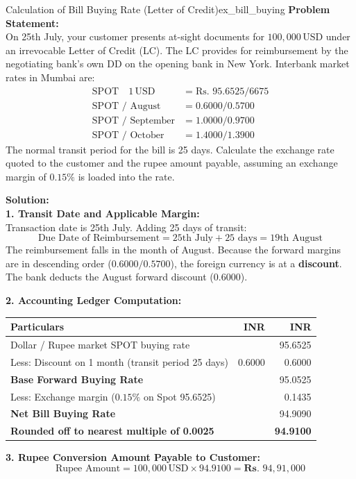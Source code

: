 \begin{example}{Calculation of Bill Buying Rate (Letter of Credit)}{ex_bill_buying}
\textbf{Problem Statement:}\\
On 25th July, your customer presents at-sight documents for $100,000\,\text{USD}$ under an irrevocable Letter of Credit (LC). The LC provides for reimbursement by the negotiating bank's own DD on the opening bank in New York. Interbank market rates in Mumbai are:
\begin{align*}
    \text{SPOT} \quad 1\,\text{USD} &= \text{Rs. } 95.6525 / 6675 \\
    \text{SPOT / August} &= 0.6000 / 0.5700 \\
    \text{SPOT / September} &= 1.0000 / 0.9700 \\
    \text{SPOT / October} &= 1.4000 / 1.3900
\end{align*}
The normal transit period for the bill is 25 days. Calculate the exchange rate quoted to the customer and the rupee amount payable, assuming an exchange margin of $0.15\%$ is loaded into the rate.

\tcblower
\textbf{Solution:}\\
\noindent\textbf{1. Transit Date and Applicable Margin:}\\
Transaction date is 25th July. Adding 25 days of transit:
\begin{equation*}
    \text{Due Date of Reimbursement} = 25\text{th July} + 25\text{ days} = 19\text{th August}
\end{equation*}
The reimbursement falls in the month of August. Because the forward margins are in descending order ($0.6000 / 0.5700$), the foreign currency is at a \textbf{discount}. The bank deducts the August forward discount ($0.6000$).

\noindent\textbf{2. Accounting Ledger Computation:}
\begin{center}
\small
\begin{tabularx}{\linewidth}{Xrr}
\toprule
\textbf{Particulars} & \textbf{INR} & \textbf{INR} \\
\midrule
Dollar / Rupee market SPOT buying rate & & 95.6525 \\
Less: Discount on 1 month (transit period 25 days) & 0.6000 & 0.6000 \\
\midrule
\textbf{Base Forward Buying Rate} & & 95.0525 \\
Less: Exchange margin ($0.15\%$ on Spot 95.6525) & & 0.1435 \\
\midrule
\textbf{Net Bill Buying Rate} & & 94.9090 \\
\textbf{Rounded off to nearest multiple of 0.0025} & & \textbf{94.9100} \\
\bottomrule
\end{tabularx}
\end{center}

\noindent\textbf{3. Rupee Conversion Amount Payable to Customer:}
\begin{equation*}
    \text{Rupee Amount} = 100,000\,\text{USD} \times 94.9100 = \textbf{Rs. } 94,91,000
\end{equation*}
\end{example}

